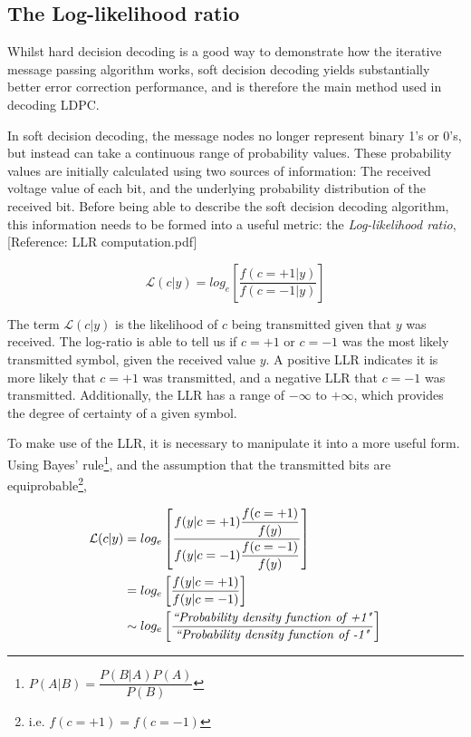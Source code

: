 \documentclass[11pt]{article}
\numberwithin{equation}{subsection}
\begin{document}
\subsection{The Log-likelihood ratio}
Whilst hard decision decoding is a good way to demonstrate how the iterative message passing algorithm works, soft decision decoding yields substantially better error correction performance, and is therefore the main method used in decoding LDPC.

In soft decision decoding, the message nodes no longer represent binary 1's or 0's, but instead can take a continuous range of probability values. These probability values are initially calculated using two sources of information: The received voltage value of each bit, and the underlying probability distribution of the received bit. Before being able to describe the soft decision decoding algorithm, this information needs to be formed into a useful metric: the \textit{Log-likelihood ratio}, [Reference: LLR computation.pdf]

\begin{equation} \label{eq:LLR}
\mathcal{L}(c|y) = log_e \left[ \dfrac{f(c=+1|y)}{f(c=-1|y)} \right]
\end{equation}

\noindent The term $\mathcal{L}(c|y)$ is the likelihood of $c$ being transmitted given that $y$ was received. The log-ratio is able to tell us if $c=+1$ or $c=-1$ was the most likely transmitted symbol, given the received value $y$. A positive LLR indicates it is more likely that $c=+1$ was transmitted, and a negative LLR that $c=-1$ was transmitted. Additionally, the LLR has a range of $-\infty$ to $+\infty$, which provides the degree of certainty of a given symbol.

To make use of the LLR, it is necessary to manipulate it into a more useful form. Using Bayes' rule\footnote{$P(A|B) = \dfrac{P(B|A) P(A)}{P(B)}$}, and the assumption that the transmitted bits are equiprobable\footnote{i.e. $f(c=+1) = f(c=-1)$},

\begin{equation}
\begin{aligned}
\mathcal{L}(c|y) &= log_e \left[ \dfrac{f(y|c=+1) \dfrac{f(c=+1)}{f(y)}}{f(y|c=-1) \dfrac{f(c=-1)}{f(y)}} \right] 
\\
&= log_e \left[ \dfrac{f(y|c=+1)} {f(y|c=-1)} \right] 
\\
&\sim log_e \left[ \dfrac{\text{\textit{``Probability density function of +1"}}}{\text{\textit{``Probability density function of -1"}}} \right]
\end{aligned}
\end{equation}
\end{document}
